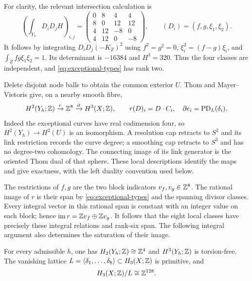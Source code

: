 For clarity, the relevant intersection calculation is
\begin{equation}\label{eq:central-intersection}
 \left(\int_{Y_h}D_iD_jH\right)_{i,j}
 =\begin{pmatrix}
 0&8&4&4\\8&0&12&12\\4&12&-8&0\\4&12&0&-8
 \end{pmatrix},\qquad (D_i)=(f,g,\xi_1,\xi_2).
\end{equation}
It follows by integrating $D_iD_j(-K_Z)^2$ using
$f^2=g^2=0$, $\xi_i^2=(f-g)\xi_i$, and
$\int_Zfg\xi_1\xi_2=1$. Its determinant is $-16384$ and
$H^3=320$. Thus the four classes are independent, and
\eqref{eq:exceptional-types} has rank two.

Delete disjoint node balls to obtain the common exterior $U$.
Thom and Mayer--Vietoris give, on a nearby smooth fibre,
\begin{equation}\label{eq:integral-attachment}
 H^2(Y_h;\mathbb Z)\xrightarrow{r}\mathbb Z^8
      \xrightarrow{\partial}H^3(X;\mathbb Z),\qquad
 r(D)_i=D\cdot C_i,\quad
 \partial e_i=\operatorname{PD}_L(\delta_i).
\end{equation}
Indeed the exceptional curves have real codimension four, so
$H^2(Y_h)\to H^2(U)$ is an isomorphism. A resolution cap retracts
to $S^2$ and its link restriction records the curve degree; a
smoothing cap retracts to $S^3$ and has no degree-two cohomology.
The connecting image of its link generator is the oriented Thom
dual of that sphere. These local descriptions identify the maps
and give exactness, with the left duality convention used below.

The restrictions of $f,g$ are the two block indicators
$v_f,v_g\in\mathbb Z^8$. The rational image of $r$ is their span by
\eqref{eq:exceptional-types} and the spanning divisor classes.
Every integral vector in this rational span is constant with an
integer value on each block; hence $\operatorname{im} r=\mathbb Z v_f\oplus\mathbb Z v_g$.
It follows that the eight local classes have precisely these
integral relations and rank-six span. The following integral argument
also determines the saturation of their image.

\begin{proposition}\label{prop:primitive-vanishing-lattice}
For every admissible $h$, one has $H_2(Y_h;\mathbb Z)\cong\mathbb Z^4$
and $H^3(Y_h;\mathbb Z)$ is torsion-free. The vanishing lattice
$L=\langle\delta_1,\ldots,\delta_8\rangle\subset H_3(X;\mathbb Z)$
is primitive, and
\[
                    H_3(X;\mathbb Z)/L\cong\mathbb Z^{128}.
\]
\end{proposition}

